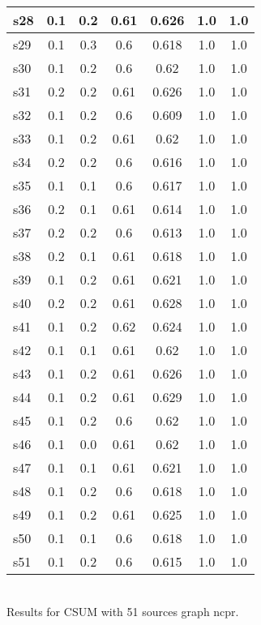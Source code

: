 \documentclass{article}
\begin{document}
\begin{tabular}{|l|c|c|c|c|c|c|}
\hline
s28 &0.1 & 0.2 & 0.61 & 0.626 & 1.0 & 1.0\\
\hline
s29 &0.1 & 0.3 & 0.6 & 0.618 & 1.0 & 1.0\\
\hline
s30 &0.1 & 0.2 & 0.6 & 0.62 & 1.0 & 1.0\\
\hline
s31 &0.2 & 0.2 & 0.61 & 0.626 & 1.0 & 1.0\\
\hline
s32 &0.1 & 0.2 & 0.6 & 0.609 & 1.0 & 1.0\\
\hline
s33 &0.1 & 0.2 & 0.61 & 0.62 & 1.0 & 1.0\\
\hline
s34 &0.2 & 0.2 & 0.6 & 0.616 & 1.0 & 1.0\\
\hline
s35 &0.1 & 0.1 & 0.6 & 0.617 & 1.0 & 1.0\\
\hline
s36 &0.2 & 0.1 & 0.61 & 0.614 & 1.0 & 1.0\\
\hline
s37 &0.2 & 0.2 & 0.6 & 0.613 & 1.0 & 1.0\\
\hline
s38 &0.2 & 0.1 & 0.61 & 0.618 & 1.0 & 1.0\\
\hline
s39 &0.1 & 0.2 & 0.61 & 0.621 & 1.0 & 1.0\\
\hline
s40 &0.2 & 0.2 & 0.61 & 0.628 & 1.0 & 1.0\\
\hline
s41 &0.1 & 0.2 & 0.62 & 0.624 & 1.0 & 1.0\\
\hline
s42 &0.1 & 0.1 & 0.61 & 0.62 & 1.0 & 1.0\\
\hline
s43 &0.1 & 0.2 & 0.61 & 0.626 & 1.0 & 1.0\\
\hline
s44 &0.1 & 0.2 & 0.61 & 0.629 & 1.0 & 1.0\\
\hline
s45 &0.1 & 0.2 & 0.6 & 0.62 & 1.0 & 1.0\\
\hline
s46 &0.1 & 0.0 & 0.61 & 0.62 & 1.0 & 1.0\\
\hline
s47 &0.1 & 0.1 & 0.61 & 0.621 & 1.0 & 1.0\\
\hline
s48 &0.1 & 0.2 & 0.6 & 0.618 & 1.0 & 1.0\\
\hline
s49 &0.1 & 0.2 & 0.61 & 0.625 & 1.0 & 1.0\\
\hline
s50 &0.1 & 0.1 & 0.6 & 0.618 & 1.0 & 1.0\\
\hline
s51 &0.1 & 0.2 & 0.6 & 0.615 & 1.0 & 1.0\\
\hline
\end{tabular}\\

\noindent Results for CSUM with 51 sources graph ncpr.
\end{document}
